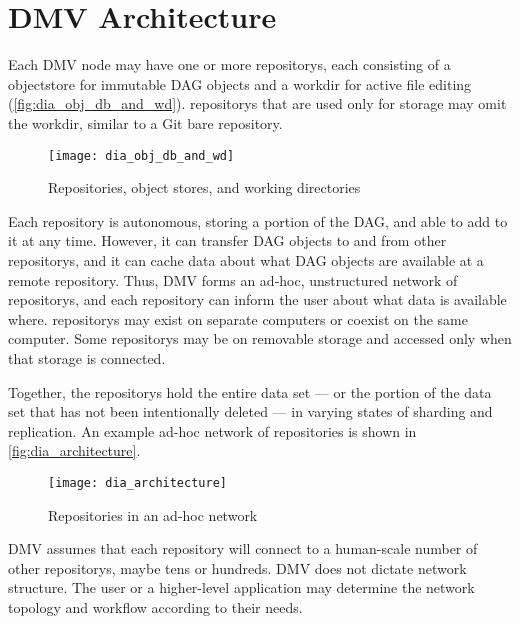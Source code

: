 \chapter{DMV Architecture}


Each \gls{DMV} node may have one or more \glspl{repository}, each consisting of
a  \gls{objectstore} for
immutable \gls{DAG} objects and a \gls{workdir} for active file editing
(\autoref{fig:dia_obj_db_and_wd}). \Glspl{repository} that are used only for
storage may omit the \gls{workdir}, similar to a Git bare \gls{repository}.

\begin{figure}[h]
    \centering
    \texttt{[image: dia\_obj\_db\_and\_wd]}
    \caption{Repositories, object stores, and working directories}
    \label{fig:dia_obj_db_and_wd}
\end{figure}

Each \gls{repository} is autonomous, storing a portion of the \gls{DAG}, and
able to add to it at any time. However, it can transfer \gls{DAG} objects to and
from other \glspl{repository}, and it can cache data about what \gls{DAG}
objects are available at a remote \gls{repository}. Thus, \gls{DMV} forms an
ad-hoc, unstructured network of \glspl{repository}, and each \gls{repository}
can inform the user about what data is available where. \Glspl{repository} may
exist on separate computers or coexist on the same computer. Some
\glspl{repository} may be on removable storage and accessed only when that
storage is connected.

Together, the \glspl{repository} hold the entire data set --- or the portion of
the data set that has not been intentionally deleted --- in varying states of
sharding and replication. An example ad-hoc network of repositories is shown in
\autoref{fig:dia_architecture}.

\begin{figure}[h]
    \centering
    \texttt{[image: dia\_architecture]}
    \caption{Repositories in an ad-hoc network}
    \label{fig:dia_architecture}
\end{figure}

\gls{DMV} assumes that each \gls{repository} will connect to a human-scale
number of other \glspl{repository}, maybe tens or hundreds. \gls{DMV} does not
dictate network structure. The user or a higher-level application may determine
the network topology and workflow according to their needs.

